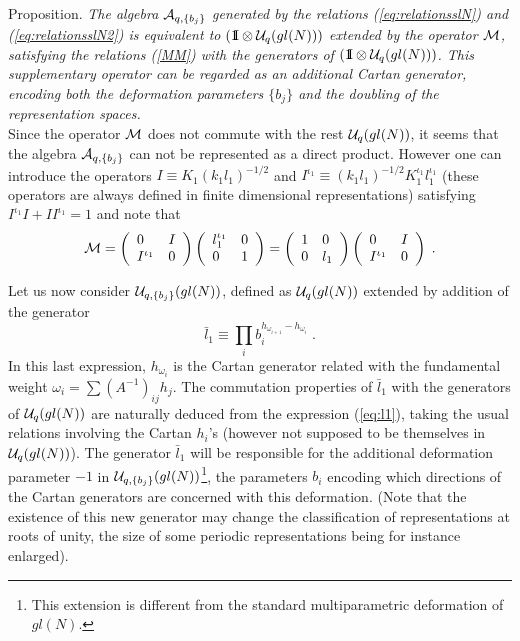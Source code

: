 \documentclass[a4paper,a4paper]{article}
\def\cA{{\cal A}}          \def\cB{{\cal B}}          \def\cC{{\cal C}}
\def\cM{{\cal M}}          \def\cN{{\cal N}}          \def\cO{{\cal O}}
\newcommand{\un}{\mbox{1\hspace{-1mm}I}}
\begin{document}
\medskip
\noindent
{\large \sc Proposition.} 
\textsl{
The algebra $\cA_{q,\{b_j\}}$ generated by the relations
(\ref{eq:relationsslN})
and (\ref{eq:relationsslN2}) is equivalent to
$\left(\un \otimes \cU_q(gl(N))\right)$ extended by the operator
$\cM$, satisfying the relations (\ref{MM}) with the generators of 
$\left(\un \otimes \cU_q(gl(N))\right)$.
This supplementary operator can be regarded
as an additional Cartan generator, encoding both the deformation 
parameters $\{b_j\}$ and the doubling of the representation spaces. 
}
\\[3mm]
Since the operator $\cM$ does not commute with the rest ${\cal U}_q(gl(N))$,
it seems that the algebra $\cA_{q,\{b_j\}}$  can not be represented as
a direct product. However one can introduce the operators
$I\equiv K_1 (k_1 l_1)^{-1/2}$ and
$I^{\iota_1}\equiv (k_1 l_1)^{-1/2} K_1^{\iota_1} l_1^{\iota_1}$
(these operators are always 
defined in finite dimensional representations) satisfying
$I^{\iota_1}I+II^{\iota_1}=1$ and note that
\begin{eqnarray}
  \label{2M}
  \cM=
  \left(\begin{array}{ll}
      0 & I \\
      I^{\iota_1} & 0  
    \end{array}
  \right) 
  \left(\begin{array}{ll}
      l_1^{\iota_1} & 0 \\
      0 & 1 
    \end{array}
  \right) 
  = 
  \left(\begin{array}{ll}
      1 & 0 \\
      0 &  l_1
    \end{array}
  \right)
  \left(\begin{array}{ll}
      0 & I \\
      I^{\iota_1} & 0  
    \end{array}
  \right) \;.
\end{eqnarray}

Let us now consider ${\cal U}_{q,\{b_j\}}(gl(N))$, defined  as
${\cal U}_{q}(gl(N))$ extended by addition of the generator 
\begin{equation}
  \label{eq:l1}
  \bar l_1 \equiv \prod_i b_i^{h_{\omega_{i+1}}-h_{\omega_{i}}} \;.
\end{equation}
In this last expression, 
$h_{\omega_{i}}$ is the Cartan generator related with the
fundamental weight $\omega_{i}=\sum{(A^{-1})}_{ij} h_j$. 
The commutation properties of $\bar l_1$ with the generators of
${\cal U}_{q}(gl(N))$ are naturally deduced from the
expression (\ref{eq:l1}), taking the usual relations involving the
Cartan $h_i$'s (however not supposed to be themselves in ${\cal U}_{q}(gl(N))$). 
The generator
$\bar l_1$ will be  responsible for the additional
deformation parameter $-1$ in ${\cal U}_{q,\{b_j\}}(gl(N))$\footnote{This
  extension is different from the standard multiparametric deformation
  of $gl(N)$.}, the parameters
$b_i$ encoding  which directions of the Cartan generators are
concerned with this deformation. (Note that the existence of this new
generator may change the classification of representations at roots of
unity, the size of some periodic representations being for instance
enlarged). 
\end{document}
